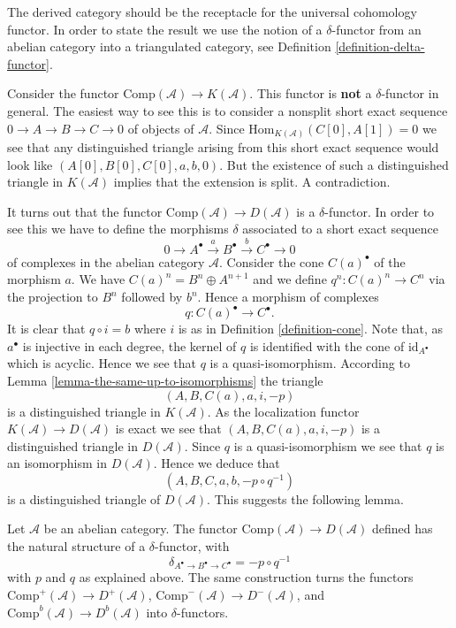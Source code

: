 \noindent
The derived category should be the receptacle for the universal
cohomology functor. In order to state the result we use
the notion of a $\delta$-functor from an abelian category
into a triangulated category, see
Definition \ref{definition-delta-functor}.

\medskip\noindent
Consider the functor
$\text{Comp}(\mathcal{A}) \to K(\mathcal{A})$.
This functor is {\bf not} a $\delta$-functor in general.
The easiest way to see this is to consider a nonsplit
short exact sequence $0 \to A \to B \to C \to 0$
of objects of $\mathcal{A}$. Since
$\text{Hom}_{K(\mathcal{A})}(C[0], A[1]) = 0$
we see that any distinguished triangle arising from
this short exact sequence would look like
$(A[0], B[0], C[0], a, b, 0)$. But the existence of such a
distinguished triangle in $K(\mathcal{A})$ implies
that the extension is split. A contradiction.

\medskip\noindent
It turns out that the functor
$\text{Comp}(\mathcal{A}) \to D(\mathcal{A})$ is a
$\delta$-functor. In order to see this we have to define
the morphisms $\delta$ associated to a short exact sequence
$$
0 \to A^\bullet \xrightarrow{a} B^\bullet \xrightarrow{b} C^\bullet \to 0
$$
of complexes in the abelian category $\mathcal{A}$.
Consider the cone $C(a)^\bullet$ of the morphism $a$.
We have $C(a)^n = B^n \oplus A^{n + 1}$ and we define
$q^n : C(a)^n \to C^n$ via the projection to $B^n$ followed
by $b^n$. Hence a morphism of complexes
$$
q : C(a)^\bullet \longrightarrow C^\bullet.
$$
It is clear that $q \circ i = b$ where $i$ is as in
Definition \ref{definition-cone}.
Note that, as $a^\bullet$ is injective in each degree,
the kernel of $q$ is identified with the cone of
$\text{id}_{A^\bullet}$ which is acyclic. Hence we see that
$q$ is a quasi-isomorphism. According to
Lemma \ref{lemma-the-same-up-to-isomorphisms}
the triangle
$$
(A, B, C(a), a, i, -p)
$$
is a distinguished triangle in $K(\mathcal{A})$.
As the localization functor
$K(\mathcal{A}) \to D(\mathcal{A})$ is
exact we see that $(A, B, C(a), a, i, -p)$ is a distinguished
triangle in $D(\mathcal{A})$. Since $q$ is a quasi-isomorphism
we see that $q$ is an isomorphism in $D(\mathcal{A})$.
Hence we deduce that
$$
(A, B, C, a, b, -p \circ q^{-1})
$$
is a distinguished triangle of $D(\mathcal{A})$.
This suggests the following lemma.

\begin{lemma}
\label{lemma-derived-canonical-delta-functor}
Let $\mathcal{A}$ be an abelian category. The functor
$\text{Comp}(\mathcal{A}) \to D(\mathcal{A})$
defined has the natural structure of a $\delta$-functor,
with
$$
\delta_{A^\bullet \to B^\bullet \to C^\bullet} = - p \circ q^{-1}
$$
with $p$ and $q$ as explained above. The same construction turns the
functors
$\text{Comp}^{+}(\mathcal{A}) \to D^{+}(\mathcal{A})$,
$\text{Comp}^{-}(\mathcal{A}) \to D^{-}(\mathcal{A})$, and
$\text{Comp}^b(\mathcal{A}) \to D^b(\mathcal{A})$
into $\delta$-functors.
\end{lemma}


